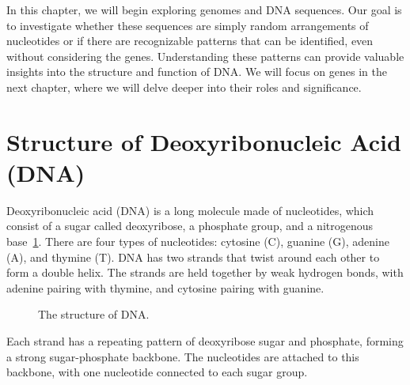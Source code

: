 In this chapter, we will begin exploring genomes and DNA sequences. Our goal is to investigate whether these sequences are simply random arrangements of nucleotides or if there are recognizable patterns that can be identified, even without considering the genes. Understanding these patterns can provide valuable insights into the structure and function of DNA. We will focus on genes in the next chapter, where we will delve deeper into their roles and significance.

\section{Structure of Deoxyribonucleic Acid (DNA)}

Deoxyribonucleic acid (DNA) is a long molecule made of nucleotides, which consist of a sugar called deoxyribose, a phosphate group, and a nitrogenous base~\ref{fig:g-dna-detail}. There are four types of nucleotides: cytosine (C), guanine (G), adenine (A), and thymine (T). DNA has two strands that twist around each other to form a double helix. The strands are held together by weak hydrogen bonds, with adenine pairing with thymine, and cytosine pairing with guanine.

\begin{figure}
    \caption[6pt]{The structure of DNA.}
    \label{fig:g-dna-detail}
  \end{figure}

Each strand has a repeating pattern of deoxyribose sugar and phosphate, forming a strong sugar-phosphate backbone. The nucleotides are attached to this backbone, with one nucleotide connected to each sugar group.

